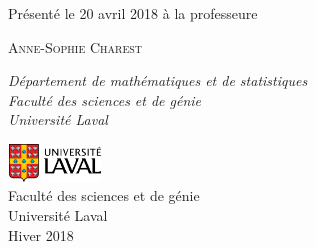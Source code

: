 \begin{titlepage}
	
	Présenté le 20 avril 2018 à la professeure
	
	\vspace{0.5\baselineskip} %
	
	{\scshape\Large Anne-Sophie Charest \\} %
	
	\vspace{0.5\baselineskip} %
	
	\textit{Département de mathématiques et de statistiques\\Faculté des sciences et de génie\\Université Laval} %
	
	\vfill %
	
	
        
        \includegraphics[height=1cm, width=2.5cm]{UL_P.pdf}\\
        Faculté des sciences et de génie\\
        Université Laval\\
        Hiver 2018       
\end{titlepage}
